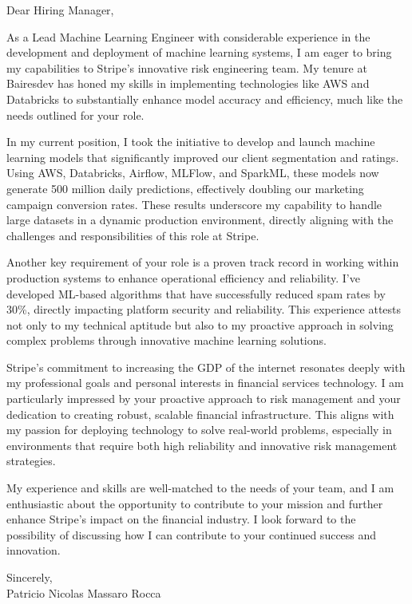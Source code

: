 \documentclass{article}
\begin{document}
\noindent Dear Hiring Manager,


As a Lead Machine Learning Engineer with considerable experience in the development and deployment of machine learning systems, I am eager to bring my capabilities to Stripe’s innovative risk engineering team. My tenure at Bairesdev has honed my skills in implementing technologies like AWS and Databricks to substantially enhance model accuracy and efficiency, much like the needs outlined for your role.


In my current position, I took the initiative to develop and launch machine learning models that significantly improved our client segmentation and ratings. Using AWS, Databricks, Airflow, MLFlow, and SparkML, these models now generate 500 million daily predictions, effectively doubling our marketing campaign conversion rates. These results underscore my capability to handle large datasets in a dynamic production environment, directly aligning with the challenges and responsibilities of this role at Stripe.


Another key requirement of your role is a proven track record in working within production systems to enhance operational efficiency and reliability. I've developed ML-based algorithms that have successfully reduced spam rates by 30\%, directly impacting platform security and reliability. This experience attests not only to my technical aptitude but also to my proactive approach in solving complex problems through innovative machine learning solutions.


Stripe’s commitment to increasing the GDP of the internet resonates deeply with my professional goals and personal interests in financial services technology. I am particularly impressed by your proactive approach to risk management and your dedication to creating robust, scalable financial infrastructure. This aligns with my passion for deploying technology to solve real-world problems, especially in environments that require both high reliability and innovative risk management strategies.


My experience and skills are well-matched to the needs of your team, and I am enthusiastic about the opportunity to contribute to your mission and further enhance Stripe’s impact on the financial industry. I look forward to the possibility of discussing how I can contribute to your continued success and innovation.

\vspace{1cm}
\setlength{\parskip}{0em}
\begin{flushright}
Sincerely,\\
Patricio Nicolas Massaro Rocca
\end{flushright}
\end{document}
